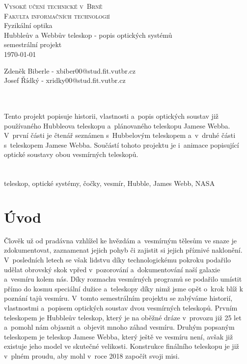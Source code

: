 \documentclass[a4paper,11pt]{article}
\begin{document}
\begin{titlepage}
\begin{center}
\Huge
\textsc{Vysoké učení technické v~Brně\\ \huge Fakulta informačních technologií}\\
\Huge Fyzikální optika \\ 
\LARGE Hubbleův a Webbův teleskop - popis optických systémů  \\
semestrální projekt \\
\today
{}
\end{center}
\Large Zdeněk Biberle - xbiber00@stud.fit.vutbr.cz \\ Josef Řídký - xridky00@stud.fit.vutbr.cz
\end{titlepage}
\newpage

\Large{}\\
\normalsize\noindent\\ Tento projekt popisuje historii, vlastnosti a~popis optických soustav již používaného Hubbleova teleskopu a~plánovaného teleskopu Jamese Webba. V~první části je čtenář seznámen s~Hubbelovým teleskopem a~v~druhé části s~teleskopem Jamese Webba. Součástí tohoto projektu je i~animace popisující optické soustavy obou vesmírných teleskopů.\\
\\
\Large{}\\
\normalsize\noindent teleskop, optické systémy, čočky, vesmír, Hubble, James Webb, NASA\\
\newpage

\tableofcontents

\newpage


\section{Úvod}
Člověk už od pradávna vzhlížel ke hvězdám a~vesmírným tělesům ve snaze je zdokumentovat, zaznamenat jejich pohyb či zajistit si jejich příznivé naklonění. V~posledních letech se však lidstvu díky technologickému pokroku podařilo udělat obrovský skok vpřed v~pozorování a~dokumentování naší galaxie a~vesmíru kolem nás. Díky rozmachu vesmírných programů se podařilo umístit přímo do kosmu speciální dužice a~teleskopy díky nimž jsme opět o~krok blíž k poznání tajů vesmíru. V~tomto semestrálním projektu se zabýváme historií, vlastnostmi a~popisem optických soustav dvou vesmírných teleskopů. Prvním teleskopem je Hubbleův teleskop, který je na oběžné dráze v~provozu již 25 let a~pomohl nám objasnit a~objevit mnoho záhad vesmíru. Druhým popsaným teleskopem je teleskop Jamese Webba, který ještě ve vesmíru není, avšak již existuje jeho model ve skutečné velikosti. Konstrukce finálního teleskopu je již v~plném proudu, aby mohl v~roce 2018 započít svoji misi. 
\end{document}
